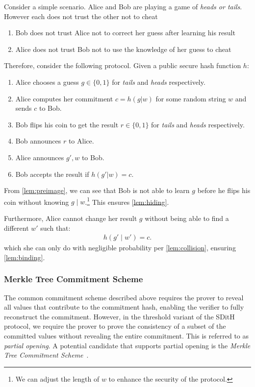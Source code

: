\documentclass[11pt]{report}
\theoremstyle{definition}
\theoremstyle{plain}
\begin{document}
Consider a simple scenario. Alice and Bob are playing a game of \textit{heads or tails}. However each does not trust the other not to cheat
\begin{enumerate}[parsep=0pt, itemsep=0pt]
  \item Bob does not trust Alice not to correct her guess after learning his result
  \item Alice does not trust Bob not to use the knowledge of her guess to cheat
\end{enumerate}
Therefore, consider the following protocol. Given a public secure hash function $h$:
\begin{enumerate}[parsep=0pt, itemsep=0pt]
  \item Alice chooses a guess $g \in \{0,1\}$ for \textit{tails} and \textit{heads} respectively.
  \item Alice computes her commitment $c = h(g | w)$ for some random string $w$ and sends $c$ to Bob.
  \item Bob flips his coin to get the result $r \in \{0,1\}$ for \textit{tails} and \textit{heads} respectively.
  \item Bob announces $r$ to Alice.
  \item Alice announces $g', w$ to Bob.
  \item Bob accepts the result if $h(g' | w) = c$.
\end{enumerate}

From \autoref{lem:preimage}, we can see that Bob is not able to learn $g$ before he flips his coin without knowing $g \mid w$.\footnote{We can adjust the length of $w$ to enhance the security of the protocol.} This ensures \autoref{lem:hiding}.

Furthermore, Alice cannot change her result $g$ without being able to find a different $w'$ such that:
\begin{align*}
  h(g' \mid w') = c.
\end{align*}
which she can only do with negligible probability per \autoref{lem:collision}, ensuring \autoref{lem:binding}.

\subsubsection{Merkle Tree Commitment Scheme}
\label{sub:merkle_tree_prelim}
The common commitment scheme described above requires the prover to reveal all values that contribute to the commitment hash, enabling the verifier to fully reconstruct the commitment. However, in the threshold variant of the SDitH protocol, we require the prover to prove the consistency of a subset of the committed values without revealing the entire commitment. This is referred to as \textit{partial opening}. A potential candidate that supports partial opening is the \textit{Merkle Tree Commitment Scheme}~\cite{becker2008merkle}.
\end{document}
